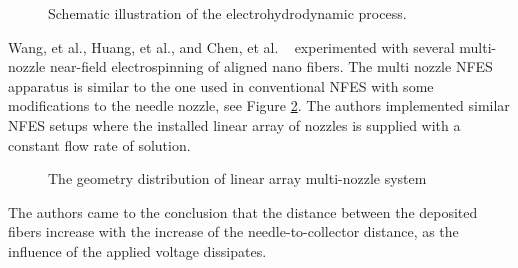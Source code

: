 \bgroup
\begin{figure}[!htbp]
\centering \makeatletter{}
\makeatother 
\caption{{Schematic illustration of the electrohydrodynamic process. \unskip~\protect\cite{527120:11974310}}}
\label{f-74de1f00848b}
\end{figure}
\egroup
Wang, et al., Huang, et al., and Chen, et al. \unskip~\cite{527120:11974322,527120:11974323,527120:11974324} experimented with several multi-nozzle near-field electrospinning of aligned nano fibers. The multi nozzle NFES apparatus is similar to the one used in conventional NFES with some modifications to the needle nozzle, see Figure \ref{f-4a1a1f58a423}. The authors implemented similar NFES setups where the installed linear array of nozzles is supplied with a constant flow rate of solution.

\bgroup
\begin{figure}[!htbp]
\centering \makeatletter{}
\makeatother 
\caption{{The geometry distribution of linear array multi-nozzle system \unskip~\protect\cite{527120:11974323}}}
\label{f-4a1a1f58a423}
\end{figure}
\egroup
The authors came to the conclusion that the distance between the deposited fibers increase with the increase of the needle-to-collector distance, as the influence of the applied voltage dissipates.

